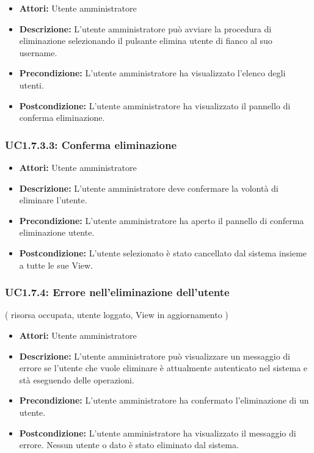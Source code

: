 \begin{itemize}
    \item \textbf{Attori:} Utente amministratore
    \item \textbf{Descrizione:} L'utente amministratore può avviare la procedura di eliminazione selezionando il pulsante elimina utente di fianco al suo username.
    \item \textbf{Precondizione:} L'utente amministratore ha visualizzato l'elenco degli utenti.
    \item \textbf{Postcondizione:} L'utente amministratore ha visualizzato il pannello di conferma eliminazione.
\end{itemize}

\subsubsection{UC1.7.3.3: Conferma eliminazione}

\begin{itemize}
    \item \textbf{Attori:} Utente amministratore
    \item \textbf{Descrizione:} L'utente amministratore deve confermare la volontà di eliminare l'utente.
    \item \textbf{Precondizione:} L'utente amministratore ha aperto il pannello di conferma eliminazione utente.
    \item \textbf{Postcondizione:} L'utente selezionato è stato cancellato dal sistema insieme a tutte le sue View.
\end{itemize}

\subsubsection{UC1.7.4: Errore nell’eliminazione dell'utente}
( risorsa occupata, utente loggato, View in aggiornamento )

\begin{itemize}
    \item \textbf{Attori:} Utente amministratore
    \item \textbf{Descrizione:} L'utente amministratore può visualizzare un messaggio di errore se l'utente che vuole eliminare è attualmente autenticato nel sistema e stà eseguendo delle operazioni.
    \item \textbf{Precondizione:} L'utente amministratore ha confermato l'eliminazione di un utente.
    \item \textbf{Postcondizione:} L'utente amministratore ha visualizzato il messaggio di errore. Nessun utente o dato è stato eliminato dal sistema.
\end{itemize}

